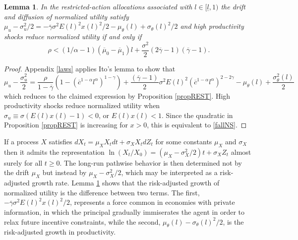 \documentclass[11pt]{article}
\theoremstyle{plain}
\newtheorem{lemma}[thm]{Lemma}
\begin{document}
\begin{lemma}\label{lawu}
In the restricted-action allocations associated with $l \in [\underline{l},1)$ the drift and diffusion of normalized utility satisfy $\mu_u - \sigma_u^2/2 = -\overline{\gamma}\sigma^2E(l)^2x(l)^2/2 - \mu_{\theta}(l) + \sigma_{\theta}(l)^2/2$ and high productivity shocks reduce normalized utility if and only if 
\begin{equation}
\rho < (1/\alpha-1)(\overline{\mu}_0 - \overline{\mu}_1)l + \frac{\sigma^2}{2}{\left(2\overline{\gamma}-1\right)} (\overline{\gamma}-1).
\label{fallNS} 
\end{equation}
\end{lemma}
\begin{proof}
Appendix \ref{laws} applies Ito's lemma to show that
\begin{equation}
\mu_u - \frac{\sigma_u^2}{2} = \frac{\rho}{1-\overline{\gamma}}(1 - (\overline{c}^{1-\alpha}l^{\alpha})^{1-\gamma}) + \frac{(\overline{\gamma}-1)}{2} \sigma^2 E(l)^2 (\overline{c}^{1-\alpha}l^{\alpha})^{2-2\gamma} - \mu_{\theta}(l) + \frac{\sigma_{\theta}^2(l)}{2}
\label{riskADJ}
\end{equation}
which reduces to the claimed expression by Proposition \ref{propREST}. High productivity shocks reduce normalized utility when $\sigma_u \equiv \sigma (E(l)x(l) - 1) < 0$, or $E(l)x(l) < 1$. Since the quadratic in Proposition \ref{propREST} is increasing for $x>0$, this is equivalent to \eqref{fallNS}.
\end{proof}

If a process $X$ satisfies $dX_t = \mu_XX_tdt + \sigma_XX_tdZ_t$ for some constants $\mu_X$ and $\sigma_X$ then it admits the representation $\ln(X_t/X_0) = (\mu_X - \sigma_X^2/2)t + \sigma_XZ_t$ almost surely for all $t\geq0$. The long-run pathwise behavior is then determined not by the drift $\mu_X$ but instead by $\mu_X - \sigma_X^2/2$, which may be interpreted as a risk-adjusted growth rate. Lemma \ref{lawu} shows that the risk-adjusted growth of normalized utility is the difference between two terms. The first, $-\overline{\gamma}\sigma^2E(l)^2x(l)^2/2$, represents a force common in economies with private information, in which the principal gradually immiserates the agent in order to relax future incentive constraints, while the second, $\mu_{\theta}(l) - \sigma_{\theta}(l)^2/2$, is the risk-adjusted growth in productivity. 
\end{document}
